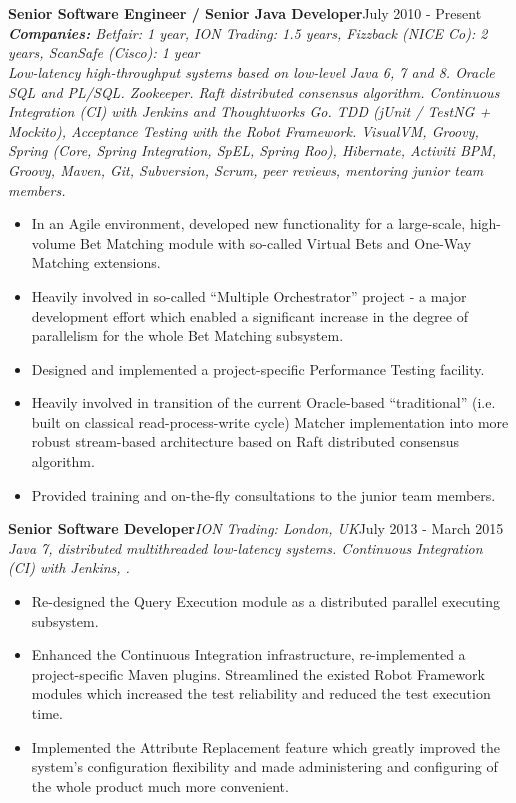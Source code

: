 \documentclass{res}
\newcommand{\jobdes}[4]{\needspace{3\baselineskip} %
{\noindent \bf #3\hspace{2ex}}{{\em \small #1}}{\hfill #2}\\{{\it \small #4.}}}
\newcommand{\aggjobdes}[4]{\needspace{3\baselineskip} %
{\noindent \bf #1\hspace{2ex}}{\hfill #2}\\
{{\noindent \small \textit{ \textbf{ Companies:} {\hfill #3}}}}\\{{\it \small #4.}}}
\newcommand{\osection}[1]{\section{\sc {\Large \textbf{#1}\\}} \vspace{0.30cm}}
\begin{document}
\begin{resume}
\begin{itemize}
\end{itemize}

\osection{Career History}
\aggjobdes {Senior Software Engineer / Senior Java Developer}{July 2010 - Present}
{Betfair: 1 year, ION Trading: 1.5 years, Fizzback (NICE Co): 2 years, ScanSafe (Cisco): 1 year}
{Low-latency high-throughput systems based on low-level Java 6, 7 and 8. Oracle SQL and PL/SQL. Zookeeper. Raft distributed consensus algorithm. Continuous Integration (CI) with Jenkins and Thoughtworks Go. TDD (jUnit / TestNG + Mockito), Acceptance Testing with the Robot Framework. VisualVM, Groovy, Spring (Core, Spring Integration, SpEL, Spring Roo), Hibernate, Activiti BPM, Groovy, Maven, Git, Subversion, Scrum, peer reviews, mentoring junior team members}
\begin{itemize}
 \item In an Agile environment, developed new functionality for a large-scale, high-volume Bet Matching module with so-called Virtual Bets and One-Way Matching extensions.
 \item Heavily involved in so-called ``Multiple Orchestrator'' project - a major development effort which enabled a significant increase in the degree of parallelism for the whole Bet Matching subsystem.
 \item Designed and implemented a project-specific Performance Testing facility.
 \item Heavily involved in transition of the current Oracle-based ``traditional'' (i.e. built on classical read-process-write cycle) Matcher implementation into more robust stream-based architecture based on Raft distributed consensus algorithm.
 \item Provided training and on-the-fly consultations to the junior team members.
 \end{itemize}

\jobdes{ION Trading: London, UK} {July 2013 - March 2015}{Senior Software Developer}
{Java 7, distributed multithreaded low-latency systems. Continuous Integration (CI) with Jenkins, }
\begin{itemize}
 \item Re-designed the Query Execution module as a distributed parallel executing subsystem.
 \item Enhanced the Continuous Integration infrastructure, re-implemented a project-specific Maven plugins. Streamlined the existed Robot Framework modules which increased the test reliability and reduced the test execution time.
 \item Implemented the Attribute Replacement feature which greatly improved the system’s configuration flexibility and made administering and configuring of the whole product much more convenient.
 \end{itemize}


\end{resume}
\end{document}
